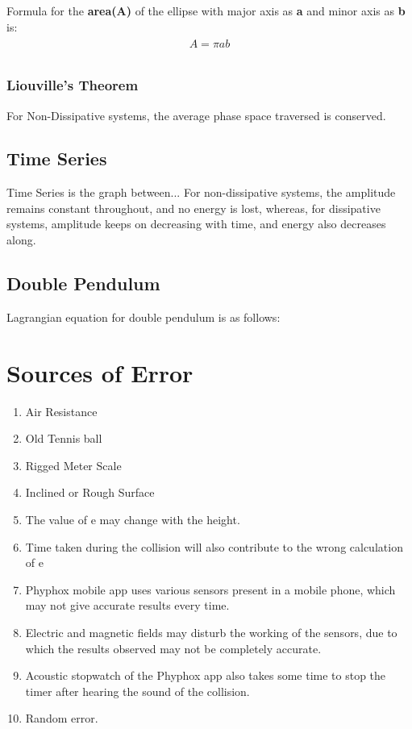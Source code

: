 \documentclass[11pt]{scrartcl} %
\begin{document}
Formula for the \textbf{area(A)} of the ellipse with major axis as \textbf{a} and minor axis as \textbf{b} is:
\begin{align} 
	\begin{split}
		A = \pi ab \nonumber\\
	\end{split}					
\end{align}

\subsubsection{Liouville's Theorem}
For Non-Dissipative systems, the average phase space traversed is conserved.

\subsection{Time Series}
Time Series is the graph between... For non-dissipative systems, the amplitude remains constant throughout, and no energy is lost, whereas, for dissipative systems, amplitude keeps on decreasing with time, and energy also decreases along.

\subsection{Double Pendulum}
Lagrangian equation for double pendulum is as follows:





\section{Sources of Error}
\begin{enumerate}
	\item Air Resistance
	\item Old Tennis ball
	\item Rigged Meter Scale
	\item Inclined or Rough Surface
	\item The value of e may change with the height.
	\item Time taken during the collision will also contribute to the wrong calculation of e
	\item Phyphox mobile app uses various sensors present in a mobile phone, which may not give accurate results every time.
	\item Electric and magnetic fields may disturb the working of the sensors, due to which the results observed may not be completely accurate.
	\item Acoustic stopwatch of the Phyphox app also takes some time to stop the timer after hearing the sound of the collision.
	\item Random error.
\end{enumerate}
\newpage
\end{document}
